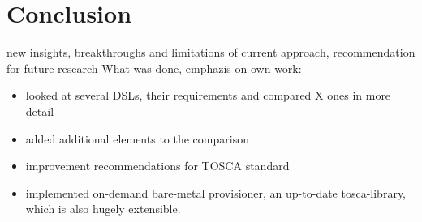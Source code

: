 \chapter{Conclusion}


new insights, breakthroughs  and limitations of current approach, recommendation for future research
\newline
What was done, emphazis on own work:

\begin{itemize}
  \item looked at several DSLs, their requirements and compared X ones in more detail
  \item added additional elements to the comparison
  \item improvement recommendations for TOSCA standard
  \item implemented on-demand bare-metal provisioner, an up-to-date tosca-library, which is also hugely extensible.
\end{itemize}
